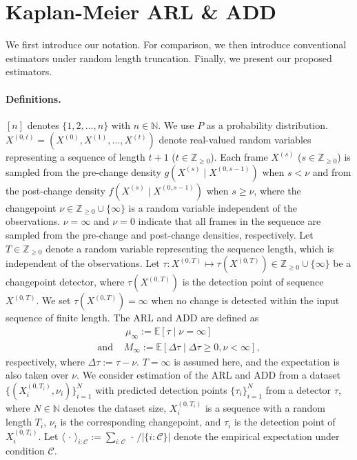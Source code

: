 \documentclass{article}
\theoremstyle{plain}
\theoremstyle{definition}
\theoremstyle{remark}
\def\mbz{\mathbb{Z}}
\def\mbn{\mathbb{N}}
\def\mbe{\mathbb{E}}
\begin{document}
\section{Kaplan-Meier ARL \& ADD} \label{sec:KM-ARL and KM-ADD}
We first introduce our notation. For comparison, we then introduce conventional estimators under random length truncation. Finally, we present our proposed estimators.

\paragraph{Definitions.}
$[n]$ denotes $\{1,2, \ldots, n\}$ with $n \in \mbn$.
We use $P$ as a probability distribution.
$X^{(0, t)} = (X^{(0)}, X^{(1)}, \ldots, X^{(t)})$ denote real-valued random variables representing a sequence of length $t+1$ ($t \in \mbz_{\geq0}$).
Each frame $X^{(s)}$ ($s \in \mbz_{\geq 0}$) is sampled from the pre-change density $g(X^{(s)} \mid X^{(0, s-1)})$ when $s < \nu$ and from the post-change density $f (X^{(s)} \mid X^{(0, s-1)} )$ when $s \geq \nu$, 
where the changepoint $\nu \in \mbz_{\geq 0} \cup \{\infty\}$ is a random variable independent of the observations.
$\nu = \infty$ and $\nu = 0$ indicate that all frames in the sequence are sampled from the pre-change and post-change densities, respectively.
Let $T \in \mbz_{\geq 0}$ denote a random variable representing the sequence length, which is independent of the observations.
Let $\tau: X^{(0, T)} \mapsto \tau (X^{(0, T)}) \in \mbz_{\geq 0}\cup\{\infty\}$ be a changepoint detector, where $\tau (X^{(0, T)})$ is the detection point of sequence $X^{(0, T)}$.
We set $\tau (X^{(0, T)}) = \infty$ when no change is detected within the input sequence of finite length. 
The ARL and ADD are defined as 
\begin{align}
    & \, \mu_\infty := \mbe[\tau \mid \nu=\infty] \\
    \text{and } & M_\infty := \mbe[\Delta\tau \mid \Delta \tau \geq 0, \nu < \infty], 
\end{align}
respectively, where $\Delta \tau := \tau - \nu$. $T=\infty$ is assumed here, and the expectation is also taken over $\nu$.
We consider estimation of the ARL and ADD from a dataset $\{ (X_i^{(0, T_i)}, \nu_i) \}_{i=1}^N$ with predicted detection points $\{ \tau_i \}_{i=1}^N$ from a detector $\tau$, where $N \in \mbn$ denotes the dataset size, $X_i^{(0, T_i)}$ is a sequence with a random length $T_i$, $\nu_i$ is the corresponding changepoint, and $\tau_i$ is the detection point of $X_i^{(0, T_i)}$.
Let $\langle \, \cdot \, \rangle_{i:\mathcal{C}} := \sum_{i:\mathcal{C}} \, \cdot \, / |\{i : \mathcal{C}\}|$ denote the empirical expectation under condition $\mathcal{C}$.
\end{document}
